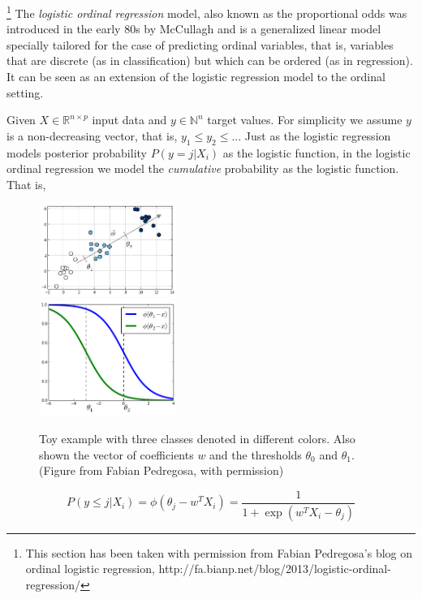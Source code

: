 \footnote{This section has been taken with permission from Fabian Pedregosa's blog on ordinal logistic regression, http://fa.bianp.net/blog/2013/logistic-ordinal-regression/} The \emph{logistic ordinal regression} model, also known as the proportional odds was introduced in the early 80s by McCullagh \cite{McCullagh1980,McCullaghNelder1989} and is a generalized linear model specially tailored for the case of predicting ordinal variables, that is, variables that are discrete (as in classification) but which can be ordered (as in regression). It can be seen as an extension of the logistic regression model to the ordinal setting.

Given $X \in {\mathbb{R}^{n \times p}}$ input data and $y \in \mathbb{N}^n$ target values. For simplicity we assume $y$ is a non-decreasing vector, that is, ${y_1} \leq {y_2} \leq ...$ Just as the logistic regression models posterior probability $P(y=j|X_i)$ as the logistic function, in the logistic ordinal regression we model the \emph{cumulative} probability as the logistic function. That is,

\begin{figure}
  \centering
  \includegraphics[width=0.4\textwidth]{../Images/ordinal_1.png}\\
  \includegraphics[width=0.4\textwidth]{../Images/ordinal_logistic.png}\\
  \caption{Toy example with three classes denoted in different colors. Also shown the vector of coefficients $w$ and the thresholds $\theta_0$ and $\theta_1$. (Figure from Fabian Pedregosa, with permission)}
\end{figure}

\begin{equation}
  P(y \leq j|X_i) = \phi(\theta_j - w^T X_i) = \frac{1}{1 + \exp(w^T X_i - \theta_j)}
\end{equation}

